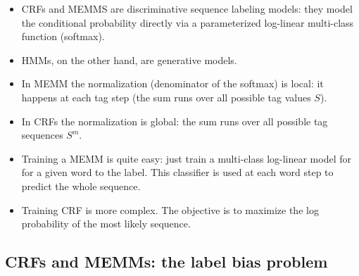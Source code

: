 \begin{itemize}

\item CRFs and MEMMS are discriminative sequence labeling models: they model the conditional probability directly via a parameterized log-linear multi-class function (softmax).

\item HMMs, on the other hand, are generative models.

\item In MEMM the normalization (denominator of the softmax) is local: it happens at each tag step (the sum runs over all possible tag values $S$).

\item In CRFs the normalization is global: the sum runs over all possible tag sequences $S^m$.

\item Training a MEMM is quite easy: just train a multi-class log-linear model for for a given word to the label. This classifier is used at each word step to predict the whole sequence.

\item Training CRF is more complex. The objective  is to maximize the log probability of the most likely sequence.


\end{itemize}






\subsection{CRFs and MEMMs: the label bias problem}


